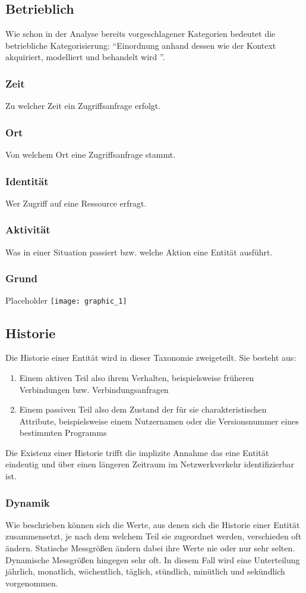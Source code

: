 \subsection{Betrieblich}
Wie schon in der Analyse bereits vorgeschlagener Kategorien bedeutet die betriebliche Kategorisierung: ``Einordnung anhand dessen wie der Kontext akquiriert, modelliert und behandelt wird ''.
\subsubsection{Zeit}
Zu welcher Zeit ein Zugriffsanfrage erfolgt.
\subsubsection{Ort}
Von welchem Ort eine Zugriffsanfrage stammt.
\subsubsection{Identität}
Wer Zugriff auf eine Ressource erfragt.
\subsubsection{Aktivität}
Was in einer Situation passiert bzw. welche Aktion eine Entität ausführt.
\subsubsection{Grund}
Placeholder\linebreak
\texttt{[image: graphic\_1]}
\subsection{Historie}
Die Historie einer Entität wird in dieser Taxonomie zweigeteilt. Sie besteht aus:
\begin{enumerate}
\item{Einem aktiven Teil also ihrem Verhalten, beispielsweise früheren Verbindungen bzw. Verbindungsanfragen}
\item{Einem passiven Teil also dem Zustand der für sie charakteristischen Attribute, beispielsweise einem Nutzernamen oder die Versionsnummer eines bestimmten Programms}
\end{enumerate}
Die Existenz einer Historie trifft die implizite Annahme das eine Entität eindeutig und über einen längeren Zeitraum im Netzwerkverkehr identifizierbar ist.
\subsubsection{Dynamik}
Wie 
 beschrieben können sich die Werte, aus denen sich die Historie einer Entität zusammensetzt, je nach dem welchem Teil sie zugeordnet werden, verschieden oft ändern.
Statische Messgrößen ändern dabei ihre Werte nie oder nur sehr selten. Dynamische Messgrößen hingegen sehr oft. In diesem Fall wird eine Unterteilung jährlich, monatlich, wöchentlich, täglich, stündlich, minütlich und sekündlich vorgenommen.
